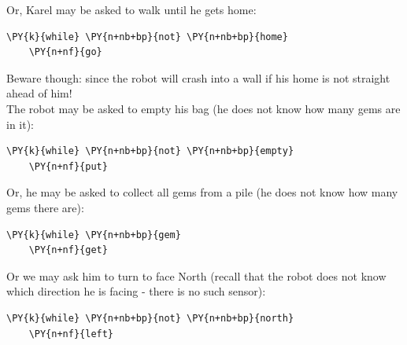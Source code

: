 \noindent
Or, Karel may be asked to walk until he gets home:\\

\begin{bbox}
\begin{Verbatim}[commandchars=\\\{\}]
\PY{k}{while} \PY{n+nb+bp}{not} \PY{n+nb+bp}{home}
    \PY{n+nf}{go}
\end{Verbatim}
\end{bbox}
\vspace{6mm}

\noindent
Beware though: {\color{red}{this program is dangerous}} since the robot will crash into a wall
if his home is not straight ahead of him!\\

\noindent
The robot may be asked to empty his bag (he does not know how many gems are in it):\\
 
\begin{bbox}
\begin{Verbatim}[commandchars=\\\{\}]
\PY{k}{while} \PY{n+nb+bp}{not} \PY{n+nb+bp}{empty}
    \PY{n+nf}{put}
\end{Verbatim}
\end{bbox}
\vspace{6mm}

\noindent
Or, he may be asked to collect all gems from a pile (he does not know 
how many gems there are):\\

\begin{bbox}
\begin{Verbatim}[commandchars=\\\{\}]
\PY{k}{while} \PY{n+nb+bp}{gem}
    \PY{n+nf}{get}
\end{Verbatim}
\end{bbox}
\vspace{6mm}

\noindent
Or we may ask him to turn to face North (recall that the robot does not know which direction he is
facing - there is no such sensor):\\

\begin{bbox}
\begin{Verbatim}[commandchars=\\\{\}]
\PY{k}{while} \PY{n+nb+bp}{not} \PY{n+nb+bp}{north}
    \PY{n+nf}{left}
\end{Verbatim}
\end{bbox}
\vspace{6mm}

